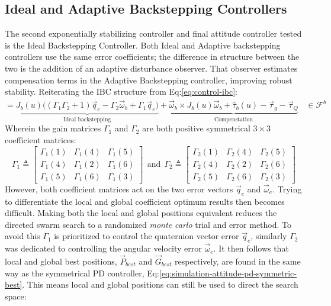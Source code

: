 \subsection{Ideal and Adaptive Backstepping Controllers}
The second exponentially stabilizing controller and final attitude controller tested is the Ideal Backstepping Controller. Both Ideal and Adaptive backstepping controllers use the same error coefficients; the difference in structure between the two is the addition of an adaptive disturbance observer. That observer estimates compensation terms in the Adaptive Backstepping controller, improving robust stability. Reiterating the IBC structure from Eq:\ref{eq:control-ibc}:
\begin{equation}\label{eq:simulation-attitude-ibc}
=\underbrace{J_b(u)\Big((\Gamma_1\Gamma_2+1)\vec{q}_e-\Gamma_2\vec{\omega}_b+\Gamma_1\dot{\vec{q}}_e \Big)}_{\text{Ideal backstepping}}
+\underbrace{\vec{\omega}_b\times J_b(u)\vec{\omega}_b+\hat{\tau}_b(u)-\vec{\tau}_g-\vec{\tau}_Q}_{\text{Compenstation}}~~~~\in\mathcal{F}^{b}
\end{equation}
Wherein the gain matrices $\Gamma_1$ and $\Gamma_2$ are both positive symmetrical $3\times 3$ coefficient matrices:
\begin{equation}\label{eq:simulation-attitde-ibc-coefficients}
\Gamma_1\triangleq \begin{bmatrix}
\Gamma_1(1) & \Gamma_1(4) & \Gamma_1(5)\\
\Gamma_1(4) & \Gamma_1(2) & \Gamma_1(6)\\
\Gamma_1(5) & \Gamma_1(6) & \Gamma_1(3)
\end{bmatrix}
~~\text{and}~~
\Gamma_2\triangleq \begin{bmatrix}
\Gamma_2(1) & \Gamma_2(4) & \Gamma_2(5)\\
\Gamma_2(4) & \Gamma_2(2) & \Gamma_2(6)\\
\Gamma_2(5) & \Gamma_2(6) & \Gamma_2(3)
\end{bmatrix}
\end{equation}
However, both coefficient matrices act on the two error vectors $\vec{q}_e$ and $\vec{\omega}_e$. Trying to differentiate the local and global coefficient optimum results then becomes difficult. Making both the local and global positions equivalent reduces the directed swarm search to a randomized \emph{monte carlo} trial and error method. To avoid this $\Gamma_1$ is prioritized to control the quaternion vector error $\vec{q}_e$, similarly $\Gamma_2$ was dedicated to controlling the angular velocity error $\vec{\omega}_e$. It then follows that local and global best positions, $\vec{P}_{best}$ and $\vec{G}_{best}$ respectively, are found in the same way as the symmetrical PD controller, Eq:\ref{eq:simulation-attitude-pd-symmetric-best}. This means local and global positions can still be used to direct the search space:
